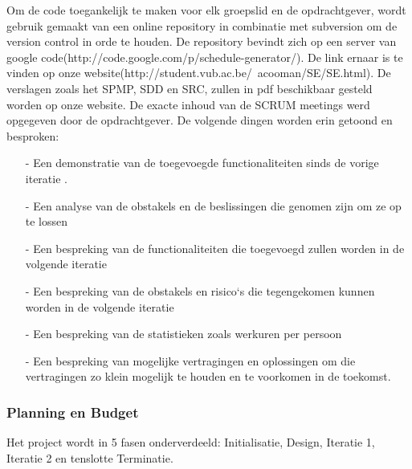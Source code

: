 \documentclass{article}
\begin{document}
Om de code toegankelijk te maken voor elk groepslid en de opdrachtgever, wordt gebruik gemaakt van een online repository in combinatie met subversion om de version control in orde te houden. De repository bevindt zich op een server van google code(http://code.google.com/p/schedule-generator/). De link ernaar is te vinden op onze website(http://student.vub.ac.be/~acooman/SE/SE.html).
De verslagen zoals het SPMP, SDD en SRC, zullen in pdf beschikbaar gesteld worden op onze website.
De exacte inhoud van de SCRUM meetings werd opgegeven door de opdrachtgever. De volgende dingen worden erin getoond en besproken: \\[-5mm]
\begin{itemize}
 \item[-] Een demonstratie van de toegevoegde functionaliteiten sinds de vorige iteratie .\\[-5mm]
 \item[-] Een analyse van de obstakels en de beslissingen die genomen zijn om ze op te lossen\\[-5mm]
 \item[-] Een bespreking van de functionaliteiten die toegevoegd zullen worden in de volgende iteratie\\[-5mm]
 \item[-] Een bespreking van de obstakels en risico`s die tegengekomen kunnen worden in de volgende iteratie \\[-5mm]
 \item[-] Een bespreking van de statistieken zoals werkuren per persoon \\[-5mm]
 \item[-] Een bespreking van mogelijke vertragingen en oplossingen om die vertragingen zo klein mogelijk te houden en te voorkomen in de toekomst.\\[-5mm]
\end{itemize}



\subsubsection{Planning en Budget}


Het project wordt in 5 fasen onderverdeeld: Initialisatie, Design, Iteratie 1, Iteratie 2 en tenslotte Terminatie.
\end{document}
